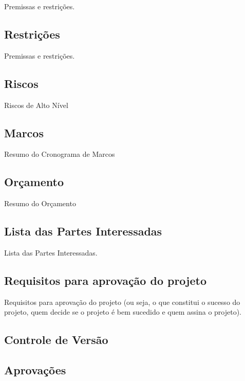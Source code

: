 Premissas e restrições.

\subsection{Restrições}

Premissas e restrições.

\subsection{Riscos}

Riscos de Alto Nível

\subsection{Marcos}

Resumo do Cronograma de Marcos

\subsection{Orçamento}

Resumo do Orçamento

\subsection{Lista das Partes Interessadas}

Lista das Partes Interessadas.

\subsection{Requisitos para aprovação do projeto}

Requisitos para aprovação do projeto (ou seja, o que constitui o sucesso do projeto, quem decide se
o projeto é bem sucedido e quem assina o projeto).

\subsection{Controle de Versão}

\subsection{Aprovações}

